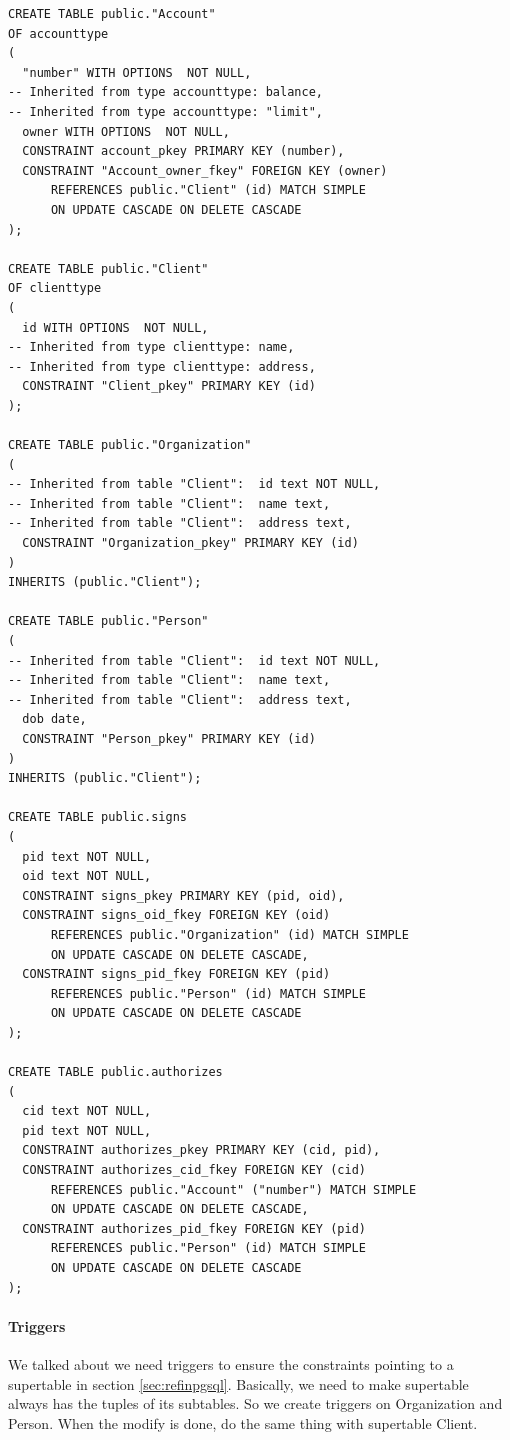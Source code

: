 \documentclass[11pt]{article}
\begin{document}
\begin{verbatim}
CREATE TABLE public."Account"
OF accounttype
(
  "number" WITH OPTIONS  NOT NULL,
-- Inherited from type accounttype: balance,
-- Inherited from type accounttype: "limit",
  owner WITH OPTIONS  NOT NULL,
  CONSTRAINT account_pkey PRIMARY KEY (number),
  CONSTRAINT "Account_owner_fkey" FOREIGN KEY (owner)
      REFERENCES public."Client" (id) MATCH SIMPLE
      ON UPDATE CASCADE ON DELETE CASCADE
);

CREATE TABLE public."Client"
OF clienttype
(
  id WITH OPTIONS  NOT NULL,
-- Inherited from type clienttype: name,
-- Inherited from type clienttype: address,
  CONSTRAINT "Client_pkey" PRIMARY KEY (id)
);

CREATE TABLE public."Organization"
(
-- Inherited from table "Client":  id text NOT NULL,
-- Inherited from table "Client":  name text,
-- Inherited from table "Client":  address text,
  CONSTRAINT "Organization_pkey" PRIMARY KEY (id)
)
INHERITS (public."Client");

CREATE TABLE public."Person"
(
-- Inherited from table "Client":  id text NOT NULL,
-- Inherited from table "Client":  name text,
-- Inherited from table "Client":  address text,
  dob date,
  CONSTRAINT "Person_pkey" PRIMARY KEY (id)
)
INHERITS (public."Client");

CREATE TABLE public.signs
(
  pid text NOT NULL,
  oid text NOT NULL,
  CONSTRAINT signs_pkey PRIMARY KEY (pid, oid),
  CONSTRAINT signs_oid_fkey FOREIGN KEY (oid)
      REFERENCES public."Organization" (id) MATCH SIMPLE
      ON UPDATE CASCADE ON DELETE CASCADE,
  CONSTRAINT signs_pid_fkey FOREIGN KEY (pid)
      REFERENCES public."Person" (id) MATCH SIMPLE
      ON UPDATE CASCADE ON DELETE CASCADE
);

CREATE TABLE public.authorizes
(
  cid text NOT NULL,
  pid text NOT NULL,
  CONSTRAINT authorizes_pkey PRIMARY KEY (cid, pid),
  CONSTRAINT authorizes_cid_fkey FOREIGN KEY (cid)
      REFERENCES public."Account" ("number") MATCH SIMPLE
      ON UPDATE CASCADE ON DELETE CASCADE,
  CONSTRAINT authorizes_pid_fkey FOREIGN KEY (pid)
      REFERENCES public."Person" (id) MATCH SIMPLE
      ON UPDATE CASCADE ON DELETE CASCADE
);
\end{verbatim}

\paragraph{Triggers}
\par
We talked about we need triggers to ensure the constraints pointing to a supertable in section \ref{sec:refinpgsql}. Basically, we need to make supertable always has the tuples of its subtables. So we create triggers on Organization and Person. When the modify is done, do the same thing with supertable Client.
\end{document}

